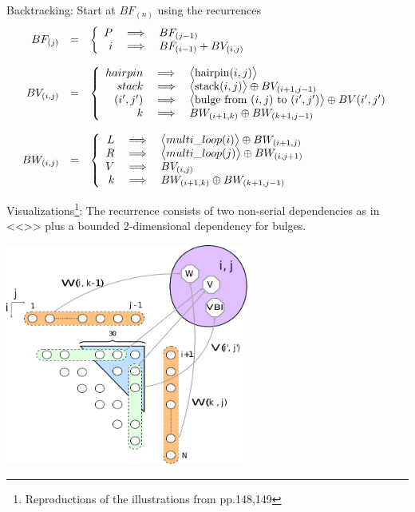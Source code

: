 \item Backtracking: Start at $BF_{(n)}$ using the recurrences
 \[\begin{array}{rcl}
	BF_{(j)} &=& \left\{\begin{array}{rcl} P&\implies& BF_{(j-1)} \\ i &\implies& BF_{(i-1)} + BV_{(i,j)} \end{array} \right.\\
	\\
	BV_{(i,j)} &=& \left\{\begin{array}{rcl}
		hairpin &\implies&\big< {\rm hairpin}(i,j) \big> \\
		stack &\implies& \big< {\rm stack}(i,j) \big> \oplus BV_{(i+1,j-1)} \\
		(i',j') &\implies& \big< \text{bulge from $(i,j)$ to }(i',j') \big> \oplus BV(i',j')\\
		k &\implies& BW_{(i+1,k)} \oplus BW_{(k+1,j-1)}
	\end{array}\right.\\
	\\
	BW_{(i,j)} &=& \left\{\begin{array}{rcl}
	L & \implies & \big< multi\_loop(i) \big> \oplus BW_{(i+1,j)} \\
	R & \implies & \big< multi\_loop(j) \big> \oplus BW_{(i,j+1)} \\
	V &\implies& BV_{(i,j)} \\
	k &\implies& BW_{(i+1,k)} \oplus BW_{(k+1,j-1)}
	\end{array}\right.
\end{array}\]

\item Visualizations\footnote{Reproductions of the illustrations from \cite{para_dprec} pp.148,149}:
The recurrence consists of two non-serial dependencies as in <<>> plus a bounded 2-dimensional dependency for bulges.
\begin{center}\includegraphics[width=8cm]{inc/zuker_rec.pdf}\end{center}

